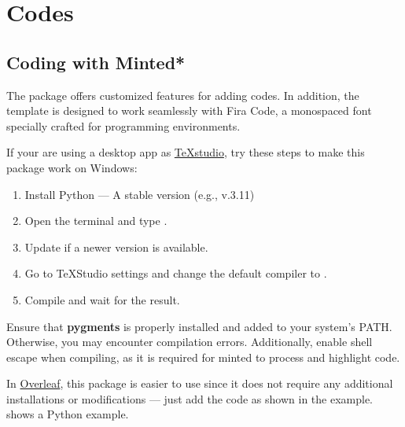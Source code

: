 \documentclass[9pt,a4paper,twocolumn,twoside]{rho-class/rho}
\begin{document}
\section{Codes}

	\subsection{Coding with Minted*}
	
		The  package offers customized features for adding codes. In addition, the template is designed to work seamlessly with Fira Code, a monospaced font specially crafted for programming environments.

        If your are using a desktop app as \href{https://www.texstudio.org/}{TeXstudio}, try these steps to make this package work on Windows:
		
		\begin{enumerate}
			\item Install Python — A stable version (e.g., v.3.11)
			\item Open the terminal and type .
			\item Update if a newer version is available.
			\item Go to TeXStudio settings and change the default compiler to .
			\item Compile and wait for the result.
		\end{enumerate}
        
		\vspace*{-9pt}
        
		\begin{rhoenv}[frametitle=Caution]
			Ensure that \textbf{pygments} is properly installed and added to your system’s PATH. Otherwise, you may encounter compilation errors. Additionally, enable shell escape when compiling, as it is required for minted to process and highlight code.
		\end{rhoenv}
		
		In \href{https://es.overleaf.com/}{Overleaf}, this package is easier to use since it does not require any additional installations or modifications — just add the code as shown in the example.  shows a Python example.
		
		\begin{code}
			\inputminted{python}{example.py}
            \caption{Python code example with minted.}
			\label{lst:example}
		\end{code}
		
\end{document}
